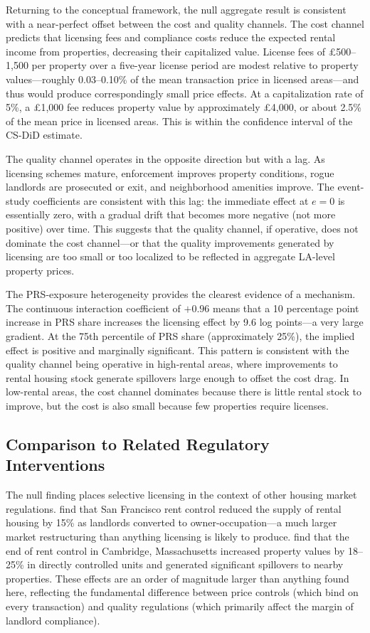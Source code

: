 \documentclass[12pt]{article}
\begin{document}
Returning to the conceptual framework, the null aggregate result is consistent with a near-perfect offset between the cost and quality channels. The cost channel predicts that licensing fees and compliance costs reduce the expected rental income from properties, decreasing their capitalized value. License fees of \pounds 500--1,500 per property over a five-year license period are modest relative to property values---roughly 0.03--0.10\% of the mean transaction price in licensed areas---and thus would produce correspondingly small price effects. At a capitalization rate of 5\%, a \pounds 1,000 fee reduces property value by approximately \pounds 4,000, or about 2.5\% of the mean price in licensed areas. This is within the confidence interval of the CS-DiD estimate.

The quality channel operates in the opposite direction but with a lag. As licensing schemes mature, enforcement improves property conditions, rogue landlords are prosecuted or exit, and neighborhood amenities improve. The event-study coefficients are consistent with this lag: the immediate effect at $e = 0$ is essentially zero, with a gradual drift that becomes more negative (not more positive) over time. This suggests that the quality channel, if operative, does not dominate the cost channel---or that the quality improvements generated by licensing are too small or too localized to be reflected in aggregate LA-level property prices.

The PRS-exposure heterogeneity provides the clearest evidence of a mechanism. The continuous interaction coefficient of $+0.96$ means that a 10 percentage point increase in PRS share increases the licensing effect by 9.6 log points---a very large gradient. At the 75th percentile of PRS share (approximately 25\%), the implied effect is positive and marginally significant. This pattern is consistent with the quality channel being operative in high-rental areas, where improvements to rental housing stock generate spillovers large enough to offset the cost drag. In low-rental areas, the cost channel dominates because there is little rental stock to improve, but the cost is also small because few properties require licenses.

\subsection{Comparison to Related Regulatory Interventions}

The null finding places selective licensing in the context of other housing market regulations. \citet{diamond2019effects} find that San Francisco rent control reduced the supply of rental housing by 15\% as landlords converted to owner-occupation---a much larger market restructuring than anything licensing is likely to produce. \citet{autor2014housing} find that the end of rent control in Cambridge, Massachusetts increased property values by 18--25\% in directly controlled units and generated significant spillovers to nearby properties. These effects are an order of magnitude larger than anything found here, reflecting the fundamental difference between price controls (which bind on every transaction) and quality regulations (which primarily affect the margin of landlord compliance).
\end{document}
